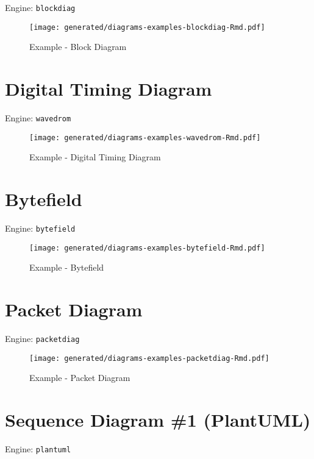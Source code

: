 \documentclass[12pt,a4paper,12pt,oneside,openany]{book}
\begin{document}
Engine: \texttt{blockdiag}

\begin{figure}
\centering
\texttt{[image: generated/diagrams-examples-blockdiag-Rmd.pdf]}
\caption{Example - Block Diagram}
\end{figure}

\newpage

\section{Digital Timing Diagram}\label{digital-timing-diagram}

Engine: \texttt{wavedrom}

\begin{figure}
\centering
\texttt{[image: generated/diagrams-examples-wavedrom-Rmd.pdf]}
\caption{Example - Digital Timing Diagram}
\end{figure}

\newpage

\section{Bytefield}\label{bytefield}

Engine: \texttt{bytefield}

\begin{figure}
\centering
\texttt{[image: generated/diagrams-examples-bytefield-Rmd.pdf]}
\caption{Example - Bytefield}
\end{figure}

\newpage

\section{Packet Diagram}\label{packet-diagram}

Engine: \texttt{packetdiag}

\begin{figure}
\centering
\texttt{[image: generated/diagrams-examples-packetdiag-Rmd.pdf]}
\caption{Example - Packet Diagram}
\end{figure}

\newpage

\section{Sequence Diagram \#1 (PlantUML)}\label{sequence-diagram-1-plantuml}

Engine: \texttt{plantuml}
\end{document}
